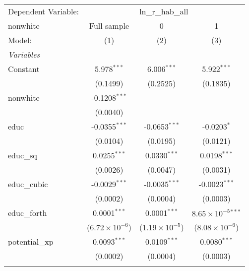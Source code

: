 \begingroup
\centering
\begin{tabular}{lccc}
   \tabularnewline \midrule \midrule
   Dependent Variable: & \multicolumn{3}{c}{ln\_r\_hab\_all}\\
   nonwhite                        & Full sample             & 0                       & 1 \\   
   Model:                          & (1)                     & (2)                     & (3)\\  
   \midrule
   \emph{Variables}\\
   Constant                        & 5.978$^{***}$           & 6.006$^{***}$           & 5.922$^{***}$\\   
                                   & (0.1499)                & (0.2525)                & (0.1835)\\   
   nonwhite                        & -0.1208$^{***}$         &                         &   \\   
                                   & (0.0040)                &                         &   \\   
   educ                            & -0.0355$^{***}$         & -0.0653$^{***}$         & -0.0203$^{*}$\\   
                                   & (0.0104)                & (0.0195)                & (0.0121)\\   
   educ\_sq                        & 0.0255$^{***}$          & 0.0330$^{***}$          & 0.0198$^{***}$\\   
                                   & (0.0026)                & (0.0047)                & (0.0031)\\   
   educ\_cubic                     & -0.0029$^{***}$         & -0.0035$^{***}$         & -0.0023$^{***}$\\   
                                   & (0.0002)                & (0.0004)                & (0.0003)\\   
   educ\_forth                     & 0.0001$^{***}$          & 0.0001$^{***}$          & $8.65\times 10^{-5}$$^{***}$\\    
                                   & ($6.72\times 10^{-6}$)  & ($1.19\times 10^{-5}$)  & ($8.08\times 10^{-6}$)\\    
   potential\_xp                   & 0.0093$^{***}$          & 0.0109$^{***}$          & 0.0080$^{***}$\\   
                                   & (0.0002)                & (0.0004)                & (0.0003)\\   
$$
\end{tabular}
